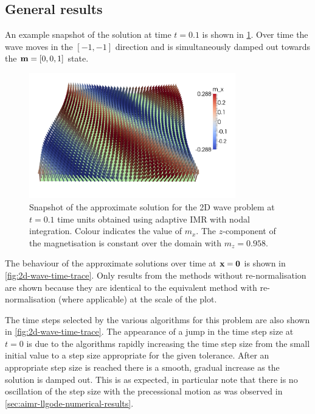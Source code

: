 \subsection{General results}

An example snapshot of the solution at time $t=0.1$ is shown in \cref{fig:2d-wave-snapshot}.
Over time the wave moves in the $[-1,-1]$ direction and is simultaneously damped out towards the $\boldsymbol{\mathrm{m}} = [0,0,1]$ state.

\begin{figure}
  \centering
  \includegraphics[width=0.8\textwidth]{images/2d_wave_picture_t0p1.pdf}
  \caption{Snapshot of the approximate solution for the 2D wave problem at $t=0.1$ time units obtained using adaptive IMR with nodal integration.
    Colour indicates the value of $m_x$.
    The $z$-component of the magnetisation is constant over the domain with $m_z = 0.958$.}
  \label{fig:2d-wave-snapshot}
\end{figure}

The behaviour of the approximate solutions over time at $\boldsymbol{\mathrm{x}} = \mathbf{0}$ is shown in \cref{fig:2d-wave-time-trace}.
Only results from the methods without re-normalisation are shown because they are identical to the equivalent method with re-normalisation (where applicable) at the scale of the plot.

The time steps selected by the various algorithms for this problem are also shown in \cref{fig:2d-wave-time-trace}.
The appearance of a jump in the time step size at $t=0$ is due to the algorithms rapidly increasing the time step size from the small initial value to a step size appropriate for the given tolerance.
After an appropriate step size is reached there is a smooth, gradual increase as the solution is damped out.
This is as expected, in particular note that there is no oscillation of the step size with the precessional motion as was observed in \cref{sec:aimr-llgode-numerical-results}.

